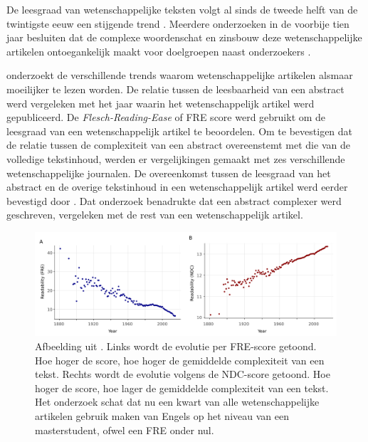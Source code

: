 De leesgraad van wetenschappelijke teksten volgt al sinds de tweede helft van de twintigste eeuw een stijgende trend \autocite{Hayes1992}. Meerdere onderzoeken in de voorbije tien jaar besluiten dat de complexe woordenschat en zinsbouw deze wetenschappelijke artikelen ontoegankelijk maakt voor doelgroepen naast onderzoekers \autocite{Ball2017, PlavenSigray2017, Jones2019}. 


\textcite{PlavenSigray2017} onderzoekt de verschillende trends waarom wetenschappelijke artikelen alsmaar moeilijker te lezen worden. De relatie tussen de leesbaarheid van een abstract werd vergeleken met het jaar waarin het wetenschappelijk artikel werd gepubliceerd. De \textit{Flesch-Reading-Ease} of FRE score werd gebruikt om de leesgraad van een wetenschappelijk artikel te beoordelen. Om te bevestigen dat de relatie tussen de complexiteit van een abstract overeenstemt met die van de volledige tekstinhoud, werden er vergelijkingen gemaakt met zes verschillende wetenschappelijke journalen. De overeenkomst tussen de leesgraad van het abstract en de overige tekstinhoud in een wetenschappelijk artikel werd eerder bevestigd door \textcite{Dronberger1975}. Dat onderzoek benadrukte dat een abstract complexer werd geschreven, vergeleken met de rest van een wetenschappelijk artikel.

\begin{figure}[H]
	\includegraphics[width=\linewidth]{img/fre-ndc.png}
	\caption{Afbeelding uit \textcite{PlavenSigray2017}. Links wordt de evolutie per FRE-score getoond. Hoe hoger de score, hoe hoger de gemiddelde complexiteit van een tekst. Rechts wordt de evolutie volgens de NDC-score getoond. Hoe hoger de score, hoe lager de gemiddelde complexiteit van een tekst. Het onderzoek schat dat nu een kwart van alle wetenschappelijke artikelen gebruik maken van Engels op het niveau van een masterstudent, ofwel een FRE onder nul.}
\end{figure}

